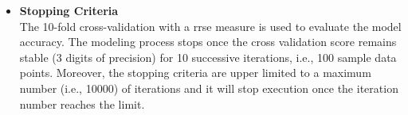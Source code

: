 \begin{itemize}
 



\item \textbf{Stopping Criteria} \\
The 10-fold cross-validation with a \gls{rrse} measure is used to evaluate the model accuracy. The modeling process stops once the cross validation score remains stable (3 digits of precision) for 10 successive iterations, i.e., 100 sample data points. Moreover, the stopping criteria are upper limited to a maximum number (i.e., 10000) of iterations and it will stop execution once the iteration number reaches the limit.



\end{itemize}











